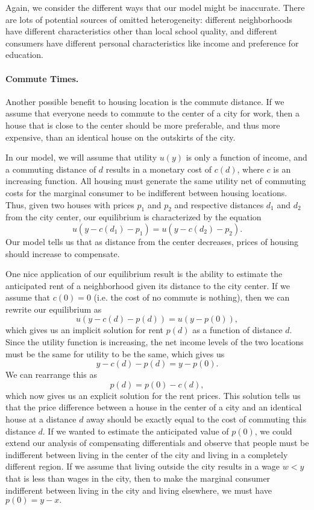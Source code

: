 Again, we consider the different ways that our model might be inaccurate. There are lots of potential sources of omitted heterogeneity: different neighborhoods have different characteristics other than local school quality, and different consumers have different personal characteristics like income and preference for education. 

\paragraph{Commute Times.} Another possible benefit to housing location is the commute distance. If we assume that everyone needs to commute to the center of a city for work, then a house that is close to the center should be more preferable, and thus more expensive, than an identical house on the outskirts of the city.

In our model, we will assume that utility $u(y)$ is only a function of income, and a commuting distance of $d$ results in a monetary cost of $c(d)$, where $c$ is an increasing function. All housing must generate the same utility net of commuting costs for the marginal consumer to be indifferent between housing locations. Thus, given two houses with prices $p_1$ and $p_2$ and respective distances $d_1$ and $d_2$ from the city center, our equilibrium is characterized by the equation
$$u(y - c(d_1) - p_1) = u(y - c(d_2) - p_2).$$
Our model tells us that as distance from the center decreases, prices of housing should increase to compensate.

One nice application of our equilibrium result is the ability to estimate the anticipated rent of a neighborhood given its distance to the city center. If we assume that $c(0) = 0$ (i.e. the cost of no commute is nothing), then we can rewrite our equilibrium as 
$$u(y-c(d)-p(d)) = u(y-p(0)),$$
which gives us an implicit solution for rent $p(d)$ as a function of distance $d$. Since the utility function is increasing, the net income levels of the two locations must be the same for utility to be the same, which gives us
$$y-c(d) - p(d) = y - p(0).$$
We can rearrange this as
$$p(d) = p(0) - c(d),$$
which now gives us an explicit solution for the rent prices. This solution tells us that the price difference between a house in the center of a city and an identical house at a distance $d$ away should be exactly equal to the cost of commuting this distance $d$. If we wanted to estimate the anticipated value of $p(0)$, we could extend our analysis of compensating differentials and observe that people must be indifferent between living in the center of the city and living in a completely different region. If we assume that living outside the city results in a wage $w < y$ that is less than wages in the city, then to make the marginal consumer indifferent between living in the city and living elsewhere, we must have $p(0) = y - x.$

